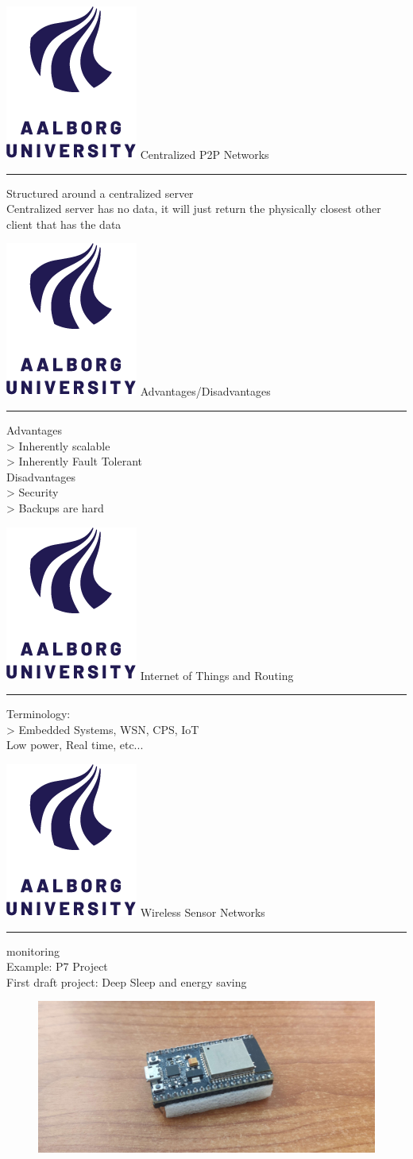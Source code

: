 \documentclass[aspectratio=1610,17pt,utf8]{beamer}
\newcommand{\mainframe}[1]{\color{blue} \includegraphics[width=.05\textwidth]{figures/aau.png} #1\\\color{black}\hrule}
\newcommand{\regularframe}[1]{\color{black}\includegraphics[width=.05\textwidth]{figures/aau.png} #1\\\hrule}
\begin{document}
\begin{frame}{\regularframe{Centralized P2P Networks}}
    Structured around a centralized server\\
    Centralized server has no data, it will just return the physically closest other client that has the data
\end{frame}

\begin{frame}{\regularframe{Advantages/Disadvantages}}
    Advantages\\
    > Inherently scalable\\
    > Inherently Fault Tolerant\\
    Disadvantages\\
    > Security\\
    > Backups are hard
\end{frame}


\begin{frame}{\mainframe{Internet of Things and Routing}}
    Terminology:\\
    > Embedded Systems, WSN, CPS, IoT\\
    Low power, Real time, etc...\\
\end{frame}

\begin{frame}{\regularframe{Wireless Sensor Networks}}
    monitoring\\

    Example: P7 Project\\
    First draft project: Deep Sleep and energy saving\\
    \begin{figure}
        \includegraphics[width=.8\textwidth]{figures/esp32.jpg}
    \end{figure}
\end{frame}
\end{document}
